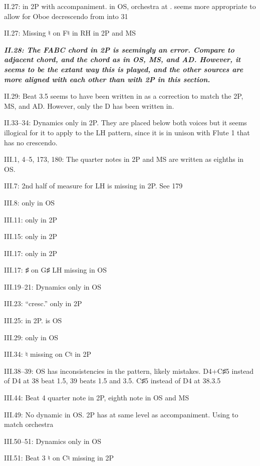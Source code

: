 \documentclass[twoside]{article}
\newcommand\dynmark[1]{\scalebox{0.9}{#1}{\kern1pt}}
\begin{document}
\begin{hangparas}{15pt}{1}
\begin{multicols}{2}
II.27: \dynmark{\pp} in 2P with \dynmark{\mezzopiano} accompaniment. \dynmark{\p} in OS, orchestra at \dynmark{\p}. \dynmark{\pp} seems more appropriate to allow for Oboe decrescendo from \dynmark{\p} into 31

II.27: Missing ♮ on F♮ in RH in 2P and MS

\textbf{\textit{II.28: The FABC chord in 2P is seemingly an error. Compare to adjacent chord, and the chord as in OS, MS, and AD. However, it seems to be the extant way this is played, and the other sources are more aligned with each other than with 2P in this section.}}

II.29: Beat 3.5 seems to have been written in as a correction to match the 2P, MS, and AD. However, only the D has been written in.

II.33--34: Dynamics only in 2P. They are placed below both voices but it seems illogical for it to apply to the LH pattern, since it is in unison with Flute 1 that has no crescendo.

III.1, 4--5, 173, 180: The quarter notes in 2P and MS are written as eighths in OS.

III.7: 2nd half of measure for LH is missing in 2P. See 179

III.8: \dynmark{\mf} only in OS

III.11: \dynmark{\ff} only in 2P

III.15: \dynmark{\f} only in 2P	

III.17: \dynmark{\p} only in 2P

III.17: ♯ on G♯ LH missing in OS

III.19--21: Dynamics only in OS

III.23: ``cresc.'' only in 2P

III.25: \dynmark{\f} in 2P. \dynmark{\ff} is OS

III.29: \dynmark{\ff} only in OS

III.34: ♮ missing on C♮ in 2P

III.38--39: OS has inconsistencies in the pattern, likely mistakes. D4+C♯5 instead of D4 at 38 beat 1.5, 39 beats 1.5 and 3.5. C♯5 instead of D4 at 38.3.5

III.44: Beat 4 quarter note in 2P, eighth note in OS and MS

III.49: No dynamic in OS. 2P has \dynmark{\pp} at same level as accompaniment. Using \dynmark{\p} to match orchestra

III.50--51: Dynamics only in OS

III.51: Beat 3 ♮ on C♮ missing in 2P


\end{multicols}
\end{hangparas}
\end{document}
